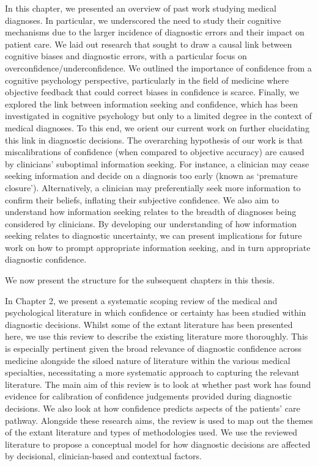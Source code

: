 \documentclass[a4paper, nobind]{templates/ociamthesis}
\begin{document}
In this chapter, we presented an overview of past work studying medical diagnoses. In particular, we underscored the need to study their cognitive mechanisms due to the larger incidence of diagnostic errors and their impact on patient care. We laid out research that sought to draw a causal link between cognitive biases and diagnostic errors, with a particular focus on overconfidence/underconfidence. We outlined the importance of confidence from a cognitive psychology perspective, particularly in the field of medicine where objective feedback that could correct biases in confidence is scarce. Finally, we explored the link between information seeking and confidence, which has been investigated in cognitive psychology but only to a limited degree in the context of medical diagnoses. To this end, we orient our current work on further elucidating this link in diagnostic decisions. The overarching hypothesis of our work is that miscalibrations of confidence (when compared to objective accuracy) are caused by clinicians' suboptimal information seeking. For instance, a clinician may cease seeking information and decide on a diagnosis too early (known as `premature closure'). Alternatively, a clinician may preferentially seek more information to confirm their beliefs, inflating their subjective confidence. We also aim to understand how information seeking relates to the breadth of diagnoses being considered by clinicians. By developing our understanding of how information seeking relates to diagnostic uncertainty, we can present implications for future work on how to prompt appropriate information seeking, and in turn appropriate diagnostic confidence.

\hfill\break
We now present the structure for the subsequent chapters in this thesis.

\hfill\break
In Chapter 2, we present a systematic scoping review of the medical and psychological literature in which confidence or certainty has been studied within diagnostic decisions. Whilst some of the extant literature has been presented here, we use this review to describe the existing literature more thoroughly. This is especially pertinent given the broad relevance of diagnostic confidence across medicine alongside the siloed nature of literature within the various medical specialties, necessitating a more systematic approach to capturing the relevant literature. The main aim of this review is to look at whether past work has found evidence for calibration of confidence judgements provided during diagnostic decisions. We also look at how confidence predicts aspects of the patients' care pathway. Alongside these research aims, the review is used to map out the themes of the extant literature and types of methodologies used. We use the reviewed literature to propose a conceptual model for how diagnostic decisions are affected by decisional, clinician-based and contextual factors.
\end{document}
